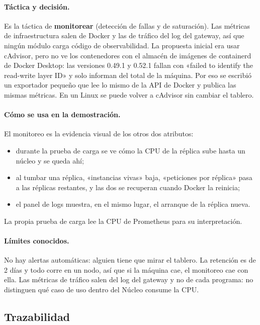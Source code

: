 \paragraph{Táctica y decisión.} Es la táctica de \textbf{monitorear} (detección de fallas y de
saturación). Las métricas de infraestructura salen de Docker y las de tráfico del log del gateway,
así que ningún módulo carga código de observabilidad. La propuesta inicial era usar cAdvisor, pero
no ve los contenedores con el almacén de imágenes de containerd de Docker Desktop: las versiones
0.49.1 y 0.52.1 fallan con «failed to identify the read-write layer ID» y solo informan del total
de la máquina. Por eso se escribió un exportador pequeño que lee lo mismo de la API
de Docker y publica las mismas métricas. En un Linux se puede volver a cAdvisor sin cambiar el
tablero.

\paragraph{Cómo se usa en la demostración.} El monitoreo es la evidencia visual de los otros dos
atributos:
\begin{itemize}[nosep]
\item durante la prueba de carga se ve cómo la CPU de la réplica sube hasta un núcleo y se queda
ahí;
\item al tumbar una réplica, «instancias vivas» baja, «peticiones por réplica» pasa a las réplicas
restantes, y las dos se recuperan cuando Docker la reinicia;
\item el panel de logs muestra, en el mismo lugar, el arranque de la réplica nueva.
\end{itemize}
La propia prueba de carga lee la CPU de Prometheus para su interpretación.

\paragraph{Límites conocidos.} No hay alertas automáticas: alguien tiene que mirar el tablero. La
retención es de 2 días y todo corre en un nodo, así que si la máquina cae, el monitoreo cae con
ella. Las métricas de tráfico salen del log del gateway y no de cada programa: no distinguen qué
caso de uso dentro del Núcleo consume la CPU.

\subsection{Trazabilidad}


